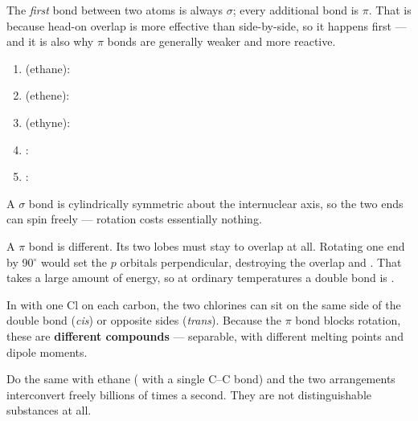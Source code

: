 \documentclass{apchem-notes}
\begin{document}
\begin{apcnote}
The \emph{first} bond between two atoms is always $\sigma$; every additional
bond is $\pi$. That is because head-on overlap is more effective than
side-by-side, so it happens first --- and it is also why $\pi$ bonds are
generally weaker and more reactive.
\end{apcnote}


\begin{enumerate}[leftmargin=*,itemsep=0.35em]
  \item {} (ethane): 
  \item {} (ethene): 
  \item {} (ethyne): 
  \item {}: 
  \item {}: 
\end{enumerate}



A $\sigma$ bond is cylindrically symmetric about the internuclear axis, so
the two ends can spin freely --- rotation costs essentially nothing.

A $\pi$ bond is different. Its two lobes must stay
 to overlap at all. Rotating one end by
90$^\circ$ would set the $p$ orbitals perpendicular, destroying the overlap
and . That takes a large amount of
energy, so at ordinary temperatures a double bond is
.

\begin{workedexample}
In  with one Cl on each carbon, the two chlorines can sit on the
same side of the double bond (\emph{cis}) or opposite sides
(\emph{trans}). Because the $\pi$ bond blocks rotation, these are
\textbf{different compounds} --- separable, with different melting points
and dipole moments.

Do the same with ethane ( with a single C--C bond) and the two
arrangements interconvert freely billions of times a second. They are not
distinguishable substances at all.
\end{workedexample}
\end{document}
